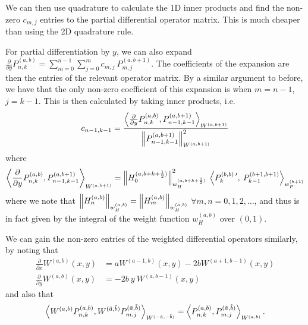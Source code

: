 \documentclass[11pt, oneside]{article}   	%
\newcommand{\half}{\frac{1}{2}}
\newcommand{\pddx}{\frac{\partial}{\partial x}}
\newcommand{\pddy}{\frac{\partial}{\partial y}}
\newcommand{\Pnkab}{P_{n,k}^{(a,b)}}
\newcommand{\Wab}{{W^{(a,b)}}}
\begin{document}

We can then use quadrature to calculate the 1D inner products and find the non-zero $c_{m,j}$ entries to the partial differential operator matrix. This is much cheaper than using the 2D quadrature rule.

For partial differentiation by $y$, we can also expand $\pddy \Pnkab = \sum_{m=0}^{n-1} \sum_{j=0}^m c_{m,j} \: P^{(a, b+1)}_{m,j}$. The coefficients of the expansion are then the entries of the relevant operator matrix. By a similar argument to before, we have that the only non-zero coefficient of this expansion is when $m = n-1$, $j = k-1$. This is then calculated by taking inner products, i.e. 
\begin{align*}
c_{n-1,k-1} = \frac{\ip<\pddy \Pnkab, P^{(a, b+1)}_{n-1,k-1} >_{W^{(a, b+1)}}}{\norm{P^{(a, b+1)}_{n-1,k-1}}^2_{W^{(a, b+1)}}}
\end{align*}
where
\begin{align}
	\ip<\pddy \Pnkab, P^{(a, b+1)}_{n-1,k-1} >_{W^{(a, b+1)}} = \norm{H_0^{(a,b+k+\half)}}^2_{w_H^{(a, b+k+\half)}} 
		\: \ip< P_k^{(b,b) \: \prime}, \: P_{k-1}^{(b+1,b+1)} >_{w_P^{(b+1)}}
\end{align}
where we note that $\left\| H_n^{(a,b)} \right\|_{w_H^{(a,b)}} = \left\| H_m^{(a,b)} \right\|_{w_H^{(a,b)}}$ $\forall m, n = 0, 1, 2, \dots$, and thus is in fact given by the integral of the weight function $w_H^{(a,b)}$ over $(0,1)$. 

We can gain the non-zero entries of the weighted differential operators similarly, by noting that
\begin{align}
	\pddx \Wab(x,y) &= a W^{(a-1, b)}(x,y) - 2bW^{(a+1, b-1)}(x,y) \label{eqn:weightderivativex} \\
	\pddy \Wab(x,y) &= -2b \: y \: W^{(a, b-1)}(x,y) \label{eqn:weightderivativey}
\end{align}
and also that
\begin{align}
	\ip< \Wab \Pnkab, W^{(\tilde{a},\tilde{b})} P^{(\tilde{a},\tilde{b})}_{m,j} >_{W^{(-\tilde{a},-\tilde{b})}} = \ip< \Pnkab, P^{(\tilde{a},\tilde{b})}_{m,j} >_\Wab.
\end{align}
\end{document}
